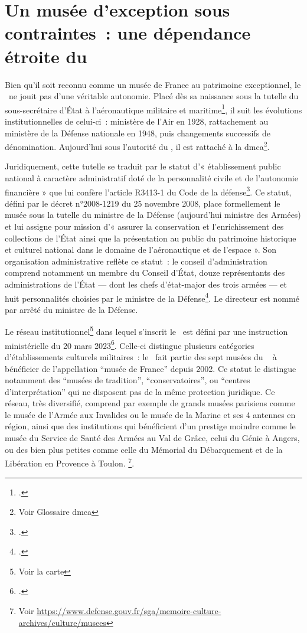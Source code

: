 \section{\label{I-B-1}Un musée d'exception sous contraintes~: une dépendance étroite du \minarm}

Bien qu'il soit reconnu comme un musée de France au patrimoine exceptionnel, le \mae~ne jouit pas d'une véritable autonomie. Placé dès sa naissance sous la tutelle du sous-secrétaire d'État à l'aéronautique militaire et maritime\footcite{terrierAeroportParisBourget2019}, il suit les évolutions institutionnelles de celui-ci~: ministère de l'Air en 1928, rattachement au ministère de la Défense nationale en 1948, puis changements successifs de dénomination. Aujourd'hui sous l'autorité du \minarm, il est rattaché à la \gls{dmca}\footnote{Voir Glossaire \gls{dmca}}.

Juridiquement, cette tutelle se traduit par le statut d'« établissement public national à caractère administratif doté de la personnalité civile et de l'autonomie financière » que lui confère l'article R3413-1 du Code de la défense\footcite{ArticleR34131Code2008}. Ce statut, défini par le décret n°2008-1219 du 25 novembre 2008, place formellement le musée sous la tutelle du ministre de la Défense (aujourd'hui ministre des Armées) et lui assigne pour mission d'« assurer la conservation et l'enrichissement des collections de l'État ainsi que la présentation au public du patrimoine historique et culturel national dans le domaine de l'aéronautique et de l'espace ». Son organisation administrative reflète ce statut~: le conseil d'administration comprend notamment un membre du Conseil d'État, douze représentants des administrations de l'État — dont les chefs d'état-major des trois armées — et huit personnalités choisies par le ministre de la Défense\footcite{ArticleR341373Code2013}. Le directeur est nommé par arrêté du ministre de la Défense.

Le réseau institutionnel\footnote{Voir la carte } dans lequel s'inscrit le \mae~est défini par une instruction ministérielle du 20 mars 2023\footcite{ministeredesarmeesInstructionNdeg303ARM2023}.
Celle-ci distingue plusieurs catégories d'établissements culturels militaires~: le \mae~fait partie des sept musées du \minarm~ à bénéficier de l'appellation \enquote{musée de France} depuis 2002. Ce statut le distingue notamment des \enquote{musées de tradition}, \enquote{conservatoires}, ou \enquote{centres d'interprétation} qui ne disposent pas de la même protection juridique. Ce réseau, très diversifié, comprend par exemple de grands musées parisiens comme le musée de l'Armée aux Invalides ou le musée de la Marine et ses 4 antennes en région, ainsi que des institutions qui bénéficient d'un prestige moindre comme le musée du Service de Santé des Armées au Val de Grâce, celui du Génie à Angers, ou des bien plus petites comme celle du Mémorial du Débarquement et de la Libération en Provence à Toulon.
\footnote{Voir \url{https://www.defense.gouv.fr/sga/memoire-culture-archives/culture/musees}}.


